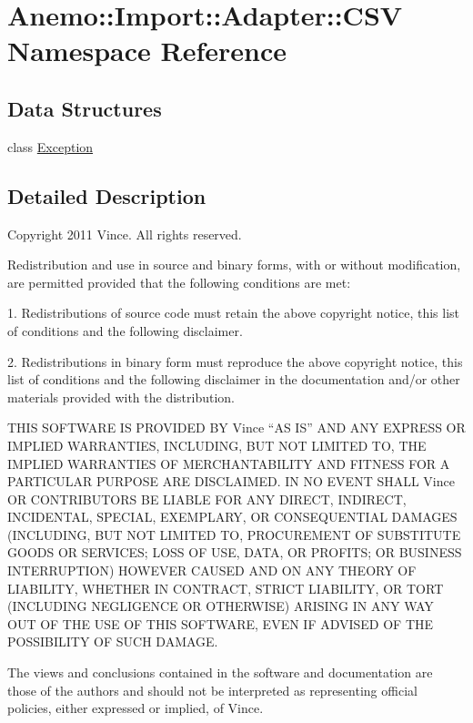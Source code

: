\hypertarget{namespace_anemo_1_1_import_1_1_adapter_1_1_c_s_v}{
\section{Anemo::Import::Adapter::CSV Namespace Reference}
\label{namespace_anemo_1_1_import_1_1_adapter_1_1_c_s_v}
}
\subsection*{Data Structures}
\begin{DoxyCompactItemize}
\item 
class \hyperlink{class_anemo_1_1_import_1_1_adapter_1_1_c_s_v_1_1_exception}{Exception}
\end{DoxyCompactItemize}


\subsection{Detailed Description}
Copyright 2011 Vince. All rights reserved.

Redistribution and use in source and binary forms, with or without modification, are permitted provided that the following conditions are met:

1. Redistributions of source code must retain the above copyright notice, this list of conditions and the following disclaimer.

2. Redistributions in binary form must reproduce the above copyright notice, this list of conditions and the following disclaimer in the documentation and/or other materials provided with the distribution.

THIS SOFTWARE IS PROVIDED BY Vince ``AS IS'' AND ANY EXPRESS OR IMPLIED WARRANTIES, INCLUDING, BUT NOT LIMITED TO, THE IMPLIED WARRANTIES OF MERCHANTABILITY AND FITNESS FOR A PARTICULAR PURPOSE ARE DISCLAIMED. IN NO EVENT SHALL Vince OR CONTRIBUTORS BE LIABLE FOR ANY DIRECT, INDIRECT, INCIDENTAL, SPECIAL, EXEMPLARY, OR CONSEQUENTIAL DAMAGES (INCLUDING, BUT NOT LIMITED TO, PROCUREMENT OF SUBSTITUTE GOODS OR SERVICES; LOSS OF USE, DATA, OR PROFITS; OR BUSINESS INTERRUPTION) HOWEVER CAUSED AND ON ANY THEORY OF LIABILITY, WHETHER IN CONTRACT, STRICT LIABILITY, OR TORT (INCLUDING NEGLIGENCE OR OTHERWISE) ARISING IN ANY WAY OUT OF THE USE OF THIS SOFTWARE, EVEN IF ADVISED OF THE POSSIBILITY OF SUCH DAMAGE.

The views and conclusions contained in the software and documentation are those of the authors and should not be interpreted as representing official policies, either expressed or implied, of Vince. 